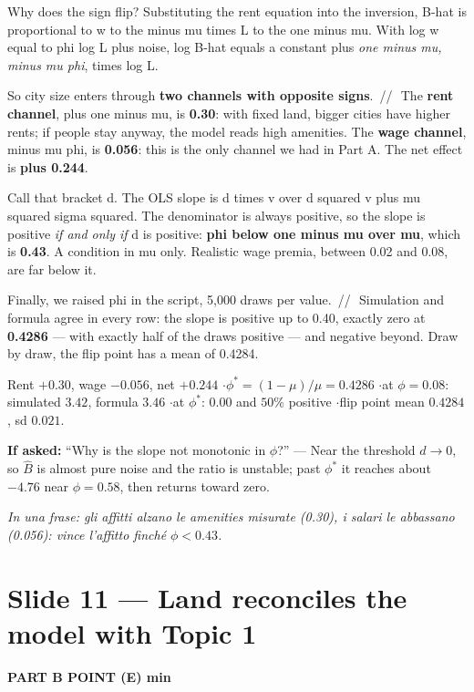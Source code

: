 \documentclass[11pt,a4paper]{article}
\newcommand{\slide}[3]{\Needspace{14\baselineskip}\section{#1}\textcolor{unicared}{\small\bfseries\MakeUppercase{#3}\quad\textperiodcentered\quad #2}\par}
\newcommand{\idea}[1]{\par{\small\itshape\color{unicablue}In una frase: #1}\par}
\newcommand{\pause}{\textcolor{unicared}{\,/\!/\,}}
\begin{document}
\begin{say}
Why does the sign flip? Substituting the rent equation into the inversion, B-hat is proportional to w to the minus mu times L to the one minus mu. With log w equal to phi log L plus noise, log B-hat equals a constant plus \emph{one minus mu, minus mu phi}, times log L.

So city size enters through \textbf{two channels with opposite signs}. \pause\ The \textbf{rent channel}, plus one minus mu, is \textbf{0.30}: with fixed land, bigger cities have higher rents; if people stay anyway, the model reads high amenities. The \textbf{wage channel}, minus mu phi, is \textbf{0.056}: this is the only channel we had in Part A. The net effect is \textbf{plus 0.244}.

Call that bracket d. The OLS slope is d times v over d squared v plus mu squared sigma squared. The denominator is always positive, so the slope is positive \emph{if and only if} d is positive: \textbf{phi below one minus mu over mu}, which is \textbf{0.43}. A condition in mu only. Realistic wage premia, between 0.02 and 0.08, are far below it.

Finally, we raised phi in the script, 5,000 draws per value. \pause\ Simulation and formula agree in every row: the slope is positive up to 0.40, exactly zero at \textbf{0.4286} --- with exactly half of the draws positive --- and negative beyond. Draw by draw, the flip point has a mean of 0.4284.
\end{say}

\begin{nums}
Rent $+0.30$, wage $-0.056$, net $+0.244$ \quad$\cdot$\quad $\phi^* = (1-\mu)/\mu = 0.4286$ \quad$\cdot$\quad at $\phi = 0.08$: simulated $3.42$, formula $3.46$ \quad$\cdot$\quad at $\phi^*$: $0.00$ and $50\%$ positive \quad$\cdot$\quad flip point mean $0.4284$, sd $0.021$.
\end{nums}
\begin{ask}
\textbf{If asked:} ``Why is the slope not monotonic in $\phi$?'' --- Near the threshold $d\to0$, so $\hat B$ is almost pure noise and the ratio is unstable; past $\phi^*$ it reaches about $-4.76$ near $\phi = 0.58$, then returns toward zero.
\end{ask}
\idea{gli affitti alzano le amenities misurate (0.30), i salari le abbassano (0.056): vince l'affitto finché $\phi < 0.43$.}

\slide{Slide 11 --- Land reconciles the model with Topic 1}{1 min}{Part B \textperiodcentered{} point (e)}
\end{document}
